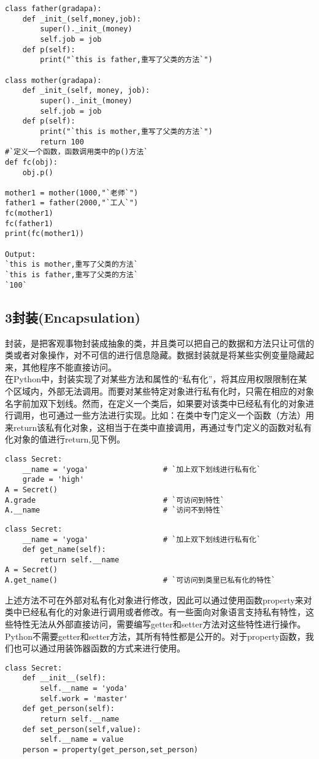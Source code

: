 \documentclass[UTF8]{ctexart}
\begin{document}
\begin{flushleft}
\begin{lstlisting}
class father(gradapa):
    def _init_(self,money,job):
        super()._init_(money)
        self.job = job
    def p(self):
        print("`this is father,重写了父类的方法`")

class mother(gradapa):
    def _init_(self, money, job):
        super()._init_(money)
        self.job = job
    def p(self):
        print("`this is mother,重写了父类的方法`")
        return 100
#`定义一个函数，函数调用类中的p()方法`
def fc(obj):    
    obj.p()

mother1 = mother(1000,"`老师`")
father1 = father(2000,"`工人`")
fc(mother1)
fc(father1)
print(fc(mother1))

Output:
`this is mother,重写了父类的方法`
`this is father,重写了父类的方法`
`100`
\end{lstlisting}

\subsection*{3\;封装(Encapsulation)}
\qquad 封装，是把客观事物封装成抽象的类，并且类可以把自己的数据和方法只让可信的类或者对象操作，对不可信的进行信息隐藏。数据封装就是将某些实例变量隐藏起来，其他程序不能直接访问。\\
\qquad 在Python中，封装实现了对某些方法和属性的“私有化”，将其应用权限限制在某个区域内，外部无法调用。而要对某些特定对象进行私有化时，只需在相应的对象名字前加双下划线。然而，在定义一个类后，如果要对该类中已经私有化的对象进行调用，也可通过一些方法进行实现。比如：在类中专门定义一个函数（方法）用来return该私有化对象，这相当于在类中直接调用，再通过专门定义的函数对私有化对象的值进行return,见下例。\\
\begin{lstlisting}
class Secret:
    __name = 'yoga'                 # `加上双下划线进行私有化`  
    grade = 'high'
A = Secret()
A.grade                             # `可访问到特性`
A.__name                            # `访问不到特性`
\end{lstlisting}
\begin{lstlisting}
class Secret:
    __name = 'yoga'                 # `加上双下划线进行私有化`  
    def get_name(self):      
        return self.__name
A = Secret()
A.get_name()                        # `可访问到类里已私有化的特性`
\end{lstlisting}
\qquad 上述方法不可在外部对私有化对象进行修改，因此可以通过使用函数property来对类中已经私有化的对象进行调用或者修改。有一些面向对象语言支持私有特性，这些特性无法从外部直接访问，需要编写getter和setter方法对这些特性进行操作。Python不需要getter和setter方法，其所有特性都是公开的。对于property函数，我们也可以通过用装饰器函数的方式来进行使用。
\begin{lstlisting}
class Secret:
    def __init__(self):
        self.__name = 'yoda'
        self.work = 'master'
    def get_person(self):
        return self.__name
    def set_person(self,value):
        self.__name = value
    person = property(get_person,set_person)


\end{lstlisting}
\end{flushleft}
\end{document}
